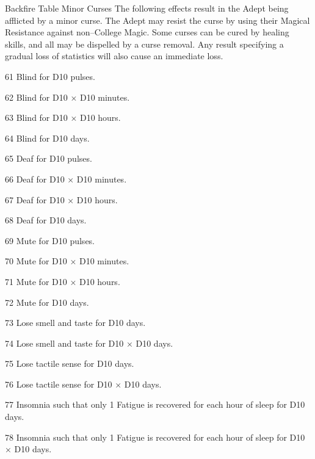 \begin{Chapter}{Backfire Table}
Minor Curses The following effects result in the Adept being afflicted
by a minor curse. The Adept may resist the curse by using their
Magical Resistance against non–College Magic. Some curses can be cured
by healing skills, and all may be dispelled by a curse removal. Any
result specifying a gradual loss of statistics will also cause an
immediate loss.

\begin{Description}

\item[61]  Blind for D10 pulses. 

\item[62] Blind for D10 × D10 minutes. 

\item[63] Blind for D10 × D10 hours. 

\item[64] Blind for D10 days. 

\item[65] Deaf for D10 pulses. 

\item[66] Deaf for D10 × D10 minutes. 

\item[67] Deaf for D10 × D10 hours. 

\item[68] Deaf for D10 days. 

\item[69] Mute for D10 pulses. 

\item[70] Mute for D10 × D10 minutes. 

\item[71] Mute for D10 × D10 hours. 

\item[72] Mute for D10 days. 

\item[73] Lose smell and taste for D10 days. 

\item[74] Lose smell and taste for D10 × D10 days. 

\item[75] Lose tactile sense for D10 days. 

\item[76] Lose tactile sense for D10 × D10 days. 

\item[77] Insomnia such that only 1 Fatigue is recovered for each hour
  of sleep for D10 days.

\item[78] Insomnia such that only 1 Fatigue is recovered for each hour
  of sleep for D10 × D10 days.


\end{Description}
\end{Chapter}
